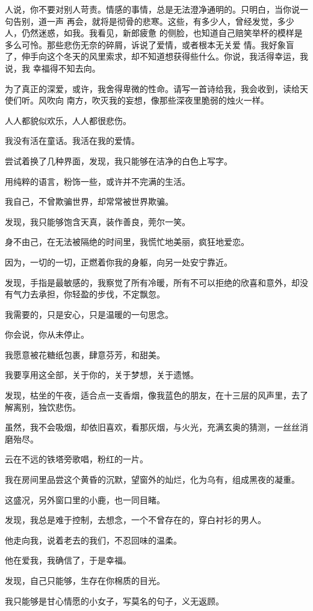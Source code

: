 \documentclass[12pt,a4paper]{article}
\begin{document}
		人说，你不要对别人苛责。情感的事情，总是无法澄净通明的。只明白，当你说一句告别，道一声
	再会，就将是彻骨的悲寒。这些，有多少人，曾经发觉，多少人，仍然迷惑，如我。我看见，新郎疲惫
	的侧脸，也知道自己赔笑举杯的模样是多么可怜。那些悲伤无奈的碎屑，诉说了爱情，或者根本无关爱
	情。我好象盲了，伸手向这个冬天的风里索求，却不知道想获得些什么。你说，我活得幸运，我说，我
	幸福得不知去向。


		为了真正的深爱，或许，我舍得卑微的性命。请写一首诗给我，我会收到，读给天使们听。风吹向
	南方，吹灭我的妄想，像那些深夜里脆弱的烛火一样。


		人人都貌似欢乐，人人都很悲伤。

		我没有活在童话。我活在我的爱情。

	\endwriting



		尝试着换了几种界面，发现，我只能够在洁净的白色上写字。\par
		用纯粹的语言，粉饰一些，或许并不完满的生活。\par
		我自己，不曾欺骗世界，却常常被世界欺骗。\par
		发现，我只能够饱含天真，装作善良，莞尔一笑。\par
		身不由己，在无法被隔绝的时间里，我慌忙地美丽，疯狂地爱恋。\par
		因为，一切的一切，正燃着你我的身躯，向另一处安宁靠近。\par
		发现，手指是最敏感的，我察觉了所有冷暖，所有不可以拒绝的欣喜和意外，却没有气力去承担，你轻盈的步伐，不定飘忽。\par
		我需要的，只是安心，只是温暖的一句思念。\par
		你会说，你从未停止。\par
		我愿意被花糖纸包裹，肆意芬芳，和甜美。\par
		我要享用这全部，关于你的，关于梦想，关于遗憾。\par
		发现，枯坐的午夜，适合点一支香烟，像我蓝色的朋友，在十三层的风声里，去了解离别，独饮悲伤。\par
		虽然，我不会吸烟，却依旧喜欢，看那灰烟，与火光，充满玄奥的猜测，一丝丝消磨殆尽。\par
		云在不远的铁塔旁歌唱，粉红的一片。\par
		我在房间里品尝这个黄昏的沉默，望窗外的灿烂，化为乌有，组成黑夜的凝重。\par
		这盛况，另外窗口里的小鹿，也一同目睹。\par
		发现，我总是难于控制，去想念，一个不曾存在的，穿白衬衫的男人。\par
		他走向我，说着老去的我们，不忍回味的温柔。\par
		他在爱我，我确信了，于是幸福。\par
		发现，自己只能够，生存在你棉质的目光。\par
		我只能够是甘心情愿的小女子，写莫名的句子，义无返顾。
\end{document}

